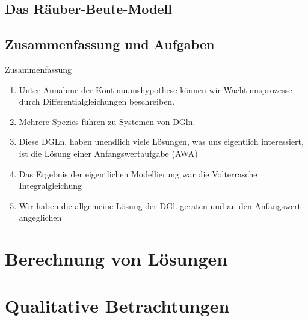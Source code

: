\documentclass[notheorems,hidelinks,aspectratio=1610]{beamer}
\begin{document}
\subsection{Das Räuber-Beute-Modell}
\frame{\subtoc}

\subsection{Zusammenfassung und Aufgaben}
\frame{\subtoc}

\begin{frame}{Zusammenfassung}
  \begin{enumerate}
  \item Unter Annahme der Kontinuumshypothese können wir
    Wachtumsprozesse durch Differentialgleichungen
    beschreiben.
  \item Mehrere Spezies führen zu Systemen von DGln.
  \item Diese DGLn. haben unendlich viele Lösungen, was uns eigentlich interessiert, ist die Lösung einer Anfangswertaufgabe (AWA)
  \item Das Ergebnis der eigentlichen Modellierung war die
    Volterrasche Integralgleichung
  \item Wir haben die allgemeine Lösung der DGl. geraten und an den
    Anfangswert angeglichen
  \end{enumerate}
\end{frame}

\section{Berechnung von Lösungen}
\frame{\sectoc}

\section{Qualitative Betrachtungen}
\frame{\sectoc}
\end{document}
